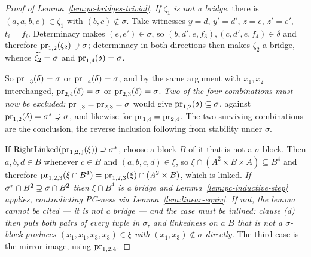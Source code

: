 \begin{proof}[Proof of Lemma~\ref{lem:pc-bridges-trivial}]
\emph{If $\zeta_{1}$ is not a bridge}, there is $(a,a,b,c)\in\zeta_{1}$ with
$(b,c)\notin\sigma$. Take witnesses $y=d$, $y'=d'$, $z=e$, $z'=e'$,
$t_{i}=f_{i}$. Determinacy makes $(e,e')\in\sigma$, so
$(b,d',e,f_{3}),(c,d',e,f_{4})\in\delta$ and therefore
$\operatorname*{pr}_{1,2}(\zeta_{2})\supsetneq\sigma$; determinacy in both directions then
makes $\zeta_{2}$ a bridge, whence $\widetilde{\zeta_{2}}=\sigma$ and
$\operatorname*{pr}_{1,4}(\delta)=\sigma$.

So $\operatorname*{pr}_{1,3}(\delta)=\sigma$ or $\operatorname*{pr}_{1,4}(\delta)=\sigma$, and by
the same argument with $x_{1},x_{2}$ interchanged, $\operatorname*{pr}_{2,4}(\delta)=\sigma$
or $\operatorname*{pr}_{2,3}(\delta)=\sigma$. \emph{Two of the four combinations must now be
excluded:} $\operatorname*{pr}_{1,3}=\operatorname*{pr}_{2,3}=\sigma$ would
give $\operatorname*{pr}_{1,2}(\delta)\subseteq\sigma$, against
$\operatorname*{pr}_{1,2}(\delta)=\sigma^{*}\supsetneq\sigma$, and likewise for
$\operatorname*{pr}_{1,4}=\operatorname*{pr}_{2,4}$. The two surviving combinations are the conclusion,
the reverse inclusion following from stability under $\sigma$.

If $\operatorname{RightLinked}(\operatorname*{pr}_{1,2,3}(\xi))\supseteq\sigma^{*}$, choose
a block $B$ of it that is not a $\sigma$-block. Then $a,b,d\in B$ whenever
$c\in B$ and $(a,b,c,d)\in\xi$, so $\xi\cap(A^{2}\times B\times A)\subseteq
B^{4}$ and therefore $\operatorname*{pr}_{1,2,3}(\xi\cap B^{4})=\operatorname*{pr}_{1,2,3}(\xi)\cap
(A^{2}\times B)$, which is linked. \emph{If $\sigma^{*}\cap B^{2}\supsetneq
\sigma\cap B^{2}$ then $\xi\cap B^{4}$ is a bridge and
Lemma~\ref{lem:pc-inductive-step} applies, contradicting PC-ness via
Lemma~\ref{lem:linear-equiv}. If not, the lemma cannot be cited --- it is not a
bridge --- and the case must be inlined: clause (d) then puts both pairs of
every tuple in $\sigma$, and linkedness on a $B$ that is not a $\sigma$-block
produces $(x_{1},x_{1},x_{3},x_{3})\in\xi$ with $(x_{1},x_{3})\notin\sigma$
directly.} The third case is the mirror image, using $\operatorname*{pr}_{1,2,4}$.
\end{proof}

